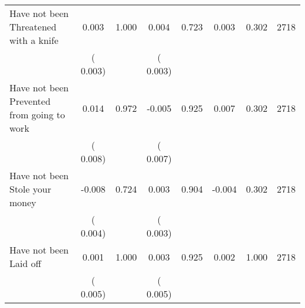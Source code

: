 \begin{tabular}{l*{7}{c}}
 Have not been Threatened with a knife       &              0.003       &        1.000  &              0.004       &        0.723  &              0.003       &              0.302 &  2718 \\ 
                       &       (       0.003)             &                               &       (       0.003)                     &                               &                                               &                                &                      \\ 

 Have not been Prevented from going to work       &              0.014       &        0.972  &             -0.005       &        0.925  &              0.007       &              0.302 &  2718 \\ 
                       &       (       0.008)             &                               &       (       0.007)                     &                               &                                               &                                &                      \\ 

 Have not been Stole your money       &             -0.008       &        0.724  &              0.003       &        0.904  &             -0.004       &              0.302 &  2718 \\ 
                       &       (       0.004)             &                               &       (       0.003)                     &                               &                                               &                                &                      \\ 

 Have not been Laid off       &              0.001       &        1.000  &              0.003       &        0.925  &              0.002       &              1.000 &  2718 \\ 
                       &       (       0.005)             &                               &       (       0.005)                     &                               &                                               &                                &                      \\ 

\hline \end{tabular}